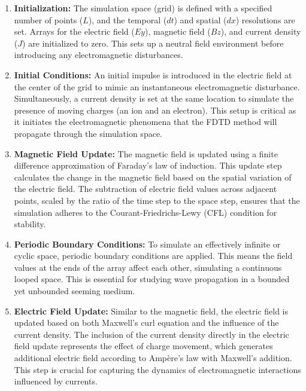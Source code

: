 \documentclass{article}[a4paper]
\begin{document}
\begin{enumerate}
    \item \textbf{Initialization:} The simulation space (grid) is defined with a specified number of points ($L$), and the temporal ($dt$) and spatial ($dx$) resolutions are set. Arrays for the electric field ($Ey$), magnetic field ($Bz$), and current density ($J$) are initialized to zero. This sets up a neutral field environment before introducing any electromagnetic disturbances.

    \item \textbf{Initial Conditions:} An initial impulse is introduced in the electric field at the center of the grid to mimic an instantaneous electromagnetic disturbance. Simultaneously, a current density is set at the same location to simulate the presence of moving charges (an ion and an electron). This setup is critical as it initiates the electromagnetic phenomena that the FDTD method will propagate through the simulation space.

    \item \textbf{Magnetic Field Update:} The magnetic field is updated using a finite difference approximation of Faraday's law of induction. This update step calculates the change in the magnetic field based on the spatial variation of the electric field. The subtraction of electric field values across adjacent points, scaled by the ratio of the time step to the space step, ensures that the simulation adheres to the Courant-Friedrichs-Lewy (CFL) condition for stability.

    \item \textbf{Periodic Boundary Conditions:} To simulate an effectively infinite or cyclic space, periodic boundary conditions are applied. This means the field values at the ends of the array affect each other, simulating a continuous looped space. This is essential for studying wave propagation in a bounded yet unbounded seeming medium.

    \item \textbf{Electric Field Update:} Similar to the magnetic field, the electric field is updated based on both Maxwell's curl equation and the influence of the current density. The inclusion of the current density directly in the electric field update represents the effect of charge movement, which generates additional electric field according to Ampère's law with Maxwell's addition. This step is crucial for capturing the dynamics of electromagnetic interactions influenced by currents.

\end{enumerate}
\end{document}
